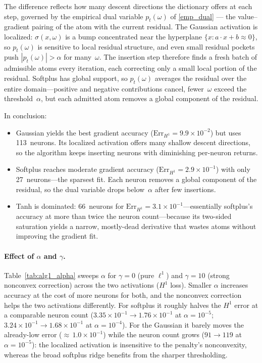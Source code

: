 \documentclass[11pt]{amsart}
\theoremstyle{definition}
\theoremstyle{remark}
\begin{document}
The difference reflects how many descent directions the dictionary offers at each step, governed by the empirical dual variable $p_t(\omega)$ of \eqref{emp_dual} --- the value--gradient pairing of the atom with the current residual.
The Gaussian activation is localized: $\sigma(x, \omega)$ is a bump concentrated near the hyperplane $\{x : a \cdot x + b \approx 0\}$, so $p_t(\omega)$ is sensitive to local residual structure, and even small residual pockets push $|p_t(\omega)| > \alpha$ for many~$\omega$.
The insertion step therefore finds a fresh batch of admissible atoms every iteration, each correcting only a small local portion of the residual.
Softplus has global support, so $p_t(\omega)$ averages the residual over the entire domain---positive and negative contributions cancel, fewer~$\omega$ exceed the threshold~$\alpha$, but each admitted atom removes a global component of the residual.

In conclusion:
\begin{itemize}
	\item Gaussian yields the best gradient accuracy ($\mathrm{Err}_{H^1} = 9.9 \times 10^{-2}$) but uses 113~neurons. Its localized activation offers many shallow descent directions, so the algorithm keeps inserting neurons with diminishing per-neuron returns.
	\item Softplus reaches moderate gradient accuracy ($\mathrm{Err}_{H^1} = 2.9 \times 10^{-1}$) with only 27~neurons---the sparsest fit. Each neuron removes a global component of the residual, so the dual variable drops below~$\alpha$ after few insertions.
	\item Tanh is dominated: 66~neurons for $\mathrm{Err}_{H^1} = 3.1 \times 10^{-1}$---essentially softplus's accuracy at more than twice the neuron count---because its two-sided saturation yields a narrow, mostly-dead derivative that wastes atoms without improving the gradient fit.
\end{itemize}



\paragraph{\textbf{Effect of $\alpha$ and $\gamma$.}}
Table~\ref{tab:alg1_alpha} sweeps $\alpha$ for $\gamma = 0$ (pure $\ell^1$) and $\gamma = 10$ (strong nonconvex correction) across the two activations ($H^1$ loss).
Smaller $\alpha$ increases accuracy at the cost of more neurons for both, and the nonconvex correction helps the two activations differently.
For softplus it roughly halves the $H^1$ error at a comparable neuron count ($3.35 \times 10^{-1} \to 1.76 \times 10^{-1}$ at $\alpha = 10^{-5}$; $3.24 \times 10^{-1} \to 1.68 \times 10^{-1}$ at $\alpha = 10^{-4}$).
For the Gaussian it barely moves the already-low error (${\approx}\,1.0 \times 10^{-1}$) while the neuron count grows ($91 \to 119$ at $\alpha = 10^{-5}$): the localized activation is insensitive to the penalty's nonconvexity, whereas the broad softplus ridge benefits from the sharper thresholding.
\end{document}
